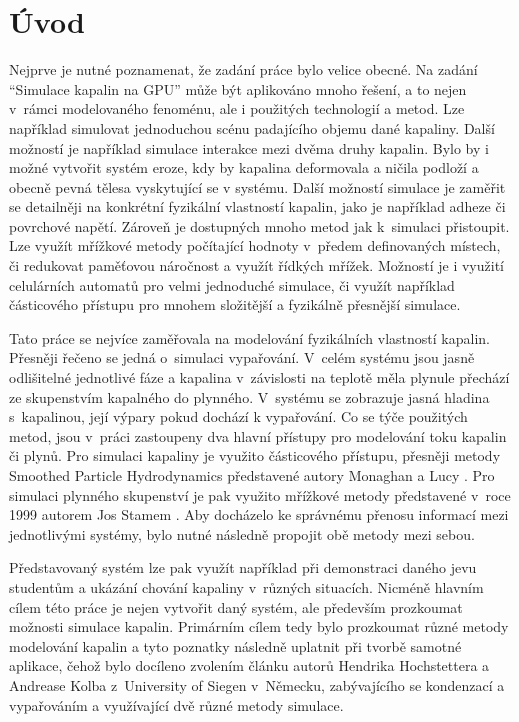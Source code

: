 \chapter{Úvod}
\label{chapter:uvod}
Nejprve je nutné poznamenat, že zadání práce bylo velice obecné. Na zadání \enquote{Simulace kapalin na GPU} může být aplikováno mnoho řešení, a to nejen v~rámci modelovaného fenoménu, ale i použitých technologií a metod. Lze například simulovat jednoduchou scénu padajícího objemu dané kapaliny. Další možností je například simulace interakce mezi dvěma druhy kapalin. Bylo by i možné vytvořit systém eroze, kdy by kapalina deformovala a ničila podloží a obecně pevná tělesa vyskytující se v systému. Další možností simulace je zaměřit se detailněji na konkrétní fyzikální vlastností kapalin, jako je například adheze či povrchové napětí. Zároveň je dostupných mnoho metod jak k~simulaci přistoupit. Lze využít mřížkové metody počítající hodnoty v~předem definovaných místech, či redukovat paměťovou náročnost a využít řídkých mřížek. Možností je i využití celulárních automatů pro velmi jednoduché simulace, či využít například částicového přístupu pro mnohem složitější a fyzikálně přesnější simulace.

Tato práce se nejvíce zaměřovala na modelování fyzikálních vlastností kapalin. Přesněji řečeno se jedná o~simulaci vypařování. V~celém systému jsou jasně odlišitelné jednotlivé fáze a kapalina v~závislosti na teplotě měla plynule přechází ze skupenstvím kapalného do plynného. V~systému se zobrazuje jasná hladina s~kapalinou, její výpary pokud dochází k vypařování. Co se týče použitých metod, jsou v~práci zastoupeny dva hlavní přístupy pro modelování toku kapalin či plynů. Pro simulaci kapaliny je využito částicového přístupu, přesněji metody Smoothed Particle Hydrodynamics představené autory Monaghan \cite{Monaghan77} a Lucy \cite{Lucy77}. Pro simulaci plynného skupenství je pak využito mřížkové metody představené v~roce 1999 autorem Jos Stamem \cite{Stam99}. Aby docházelo ke správnému přenosu informací mezi jednotlivými systémy, bylo nutné následně propojit obě metody mezi sebou.

Představovaný systém lze pak využít například při demonstraci daného jevu studentům a ukázání chování kapaliny v~různých situacích. Nicméně hlavním cílem této práce je nejen vytvořit daný systém, ale především prozkoumat možnosti simulace kapalin. Primárním cílem tedy bylo prozkoumat různé metody modelování kapalin a tyto poznatky následně uplatnit při tvorbě samotné aplikace, čehož bylo docíleno  zvolením článku \cite{Evap&Cond} autorů Hendrika Hochstettera a Andrease Kolba z~University of Siegen v~Německu, zabývajícího se kondenzací a vypařováním a využívající dvě různé metody simulace.


